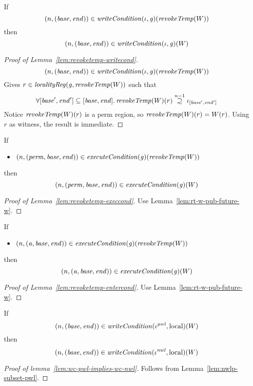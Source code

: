 \documentclass[a4paper]{article}
\newcommand\supsetsim{\mathrel{\ooalign{\raise.2ex\hbox{$\supset$}\cr
      \hidewidth\lower.8ex\hbox{\scalebox{0.9}{$\sim$}}\hidewidth\cr}}}
\newcommand{\nsupsim}[1][n]{\stackrel{\tiny{#1}}{\supsetsim}}
\newcommand{\var}[1]{\mathit{#1}}
\newcommand{\gl}{\var{g}}
\newcommand{\addr}{\var{a}}
\newcommand{\start}{\var{base}}
\newcommand{\addrend}{\var{end}}
\newcommand{\perm}{\var{perm}}
\newcommand{\nwl}{\var{nwl}}
\newcommand{\pwl}{\var{pwl}}
\newcommand{\plainfun}[2]{
  \ifthenelse{\equal{#2}{}}
  {\mathit{#1}}
  {\mathit{#1}(#2)}
}
\newcommand{\writeCond}[1]{\plainfun{writeCondition}{#1}}
\newcommand{\execCond}[1]{\plainfun{executeCondition}{#1}}
\newcommand{\revokeTemp}[1]{\plainfun{revokeTemp}{#1}}
\newcommand{\npair}[2][n]{\left(#1,#2 \right)}
\newcommand{\plainperm}[1]{\mathrm{#1}}
\newcommand{\local}{\plainperm{local}}
\newcommand{\localityReg}{\var{localityReg}}
\newcommand{\plainview}[1]{\mathrm{#1}}
\newcommand{\perma}{\plainview{perm}}
\begin{document}
\begin{lemma}
  \label{lem:revoketemp-writecond}
  If
  \[
    \npair{(\start,\addrend)} \in \writeCond{}(\iota,\gl)(\revokeTemp{W})
  \]
  then
  \[
    \npair{(\start,\addrend)} \in \writeCond{}(\iota,\gl)(W)
  \]
\end{lemma}
\begin{proof}[Proof of Lemma~\ref{lem:revoketemp-writecond}]
  \[
    \npair{(\start,\addrend)} \in \writeCond{}(\iota,\gl)(\revokeTemp{W})
  \]
  Gives $r \in \localityReg(\gl,\revokeTemp{W})$ such that
  \[
    \forall [\start',\addrend'] \subseteq [\start,\addrend] \ldotp \revokeTemp{W}(r) \nsupsim[n-1] \iota_{[\start',\addrend']}
  \]
  Notice $\revokeTemp{W}(r)$ is a $\perma$ region, so $\revokeTemp{W}(r) = W(r)$. Using $r$ as witness, the result is immediate.
\end{proof}

\begin{lemma}
  \label{lem:revoketemp-execcond}
  If
  \begin{itemize}
  \item $\npair{(\perm,\start,\addrend)} \in \execCond{}(\gl)(\revokeTemp{W})$
  \end{itemize}
  then
  \[
    \npair{(\perm,\start,\addrend)} \in \execCond{}(\gl)(W)
  \]
\end{lemma}
\begin{proof}[Proof of Lemma~\ref{lem:revoketemp-execcond}]
  Use Lemma~\ref{lem:rt-w-pub-future-w}.
\end{proof}

\begin{lemma}
  \label{lem:revoketemp-entercond}
  If
  \begin{itemize}
  \item $\npair{(\addr,\start,\addrend)} \in \execCond{}(\gl)(\revokeTemp{W})$
  \end{itemize}
  then
  \[
    \npair{(\addr,\start,\addrend)} \in \execCond{}(\gl)(W)
  \]
\end{lemma}
\begin{proof}[Proof of Lemma~\ref{lem:revoketemp-entercond}]
    Use Lemma~\ref{lem:rt-w-pub-future-w}.
\end{proof}

\begin{lemma}
  \label{lem:wc-pwl-implies-wc-nwl}
  If
  \[
    \npair{(\start,\addrend)} \in \writeCond{}(\iota^\pwl,\local)(W)
  \]
  then
  \[
    \npair{(\start,\addrend)} \in \writeCond{}(\iota^\nwl,\local)(W)
  \]
\end{lemma}
\begin{proof}[Proof of lemma~\ref{lem:wc-pwl-implies-wc-nwl}]
  Follows from Lemma~\ref{lem:nwlp-subset-pwl}.
\end{proof}
\end{document}
